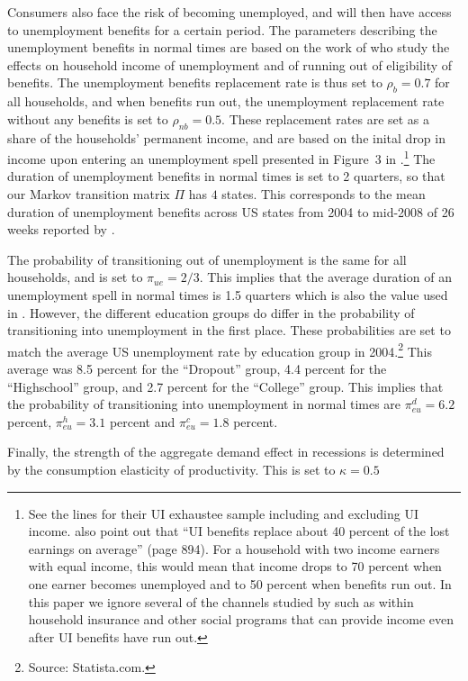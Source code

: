 \documentclass[../HAFiscal]{subfiles}
\begin{document}
Consumers also face the risk of becoming unemployed, and will then have access to unemployment benefits for a certain period. The parameters describing the unemployment benefits in normal times are based on the work of \cite{rothstein2017scraping} who study the effects on household income of unemployment and of running out of eligibility of benefits. The unemployment benefits replacement rate is thus set to $\rho_b=0.7$ for all households, and when benefits run out, the unemployment replacement rate without any benefits is set to $\rho_{nb}=0.5$. These replacement rates are set as a share of the households' permanent income, and are based on the inital drop in income upon entering an unemployment spell presented in Figure~3 in \cite{rothstein2017scraping}.\footnote{See the lines for their UI exhaustee sample including and excluding UI income. \cite{rothstein2017scraping} also point out that ``UI benefits replace about 40 percent of the lost earnings on average'' (page 894). For a household with two income earners with equal income, this would mean that income drops to 70 percent when one earner becomes unemployed and to 50 percent when benefits run out. In this paper we ignore several of the channels studied by \cite{rothstein2017scraping} such as within household insurance and other social programs that can provide income even after UI benefits have run out.} The duration of unemployment benefits in normal times is set to 2 quarters, so that our Markov transition matrix $\Pi$ has $4$ states. This corresponds to the mean duration of unemployment benefits across US states from 2004 to mid-2008 of 26 weeks reported by \cite{rothstein2017scraping}. 

The probability of transitioning out of unemployment is the same for all households, and is set to $\pi_{ue}=2/3$. This implies that the average duration of an unemployment spell in normal times is 1.5 quarters which is also the value used in \cite{carroll2020modeling}. However, the different education groups do differ in the probability of transitioning into unemployment in the first place. These probabilities are set to match the average US unemployment rate by education group in 2004.\footnote{Source: Statista.com.} This average was 8.5 percent for the ``Dropout'' group, 4.4 percent for the ``Highschool'' group, and 2.7 percent for the ``College'' group. This implies that the probability of transitioning into unemployment in normal times are $\pi_{eu}^d=6.2$ percent, $\pi_{eu}^h=3.1$ percent and $\pi_{eu}^c=1.8$ percent. 

Finally, the strength of the aggregate demand effect in recessions is determined by the consumption elasticity of productivity. This is set to $\kappa=0.5$ 
\end{document}

